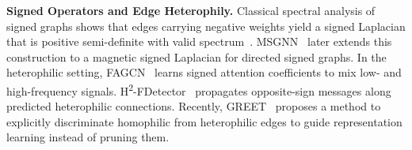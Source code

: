 \noindent \textbf{Signed Operators and Edge Heterophily.}
Classical spectral analysis of signed graphs shows that edges carrying negative weights yield a signed Laplacian that is positive semi-definite with valid spectrum~\citep{KunegisSigned}.
MSGNN~\citep{MSGNN} later extends this construction to a magnetic signed Laplacian for directed signed graphs.
In the heterophilic setting, FAGCN~\citep{FAGCN} learns signed attention coefficients to mix low- and high-frequency signals.
H\textsuperscript{2}-FDetector~\citep{H2-FDetector} propagates opposite-sign messages along predicted heterophilic connections.
Recently, GREET~\citep{GREET} proposes a method to explicitly discriminate
homophilic from heterophilic edges to guide representation learning instead of pruning them.


